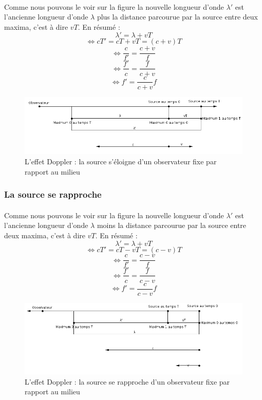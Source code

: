 \documentclass[a4paper]{article}
\begin{document}
\paragraph{}Comme nous pouvons le voir sur la figure la nouvelle longueur d'onde $\lambda'$ est l'ancienne longueur d'onde $\lambda$ plus la distance parcourue par la source entre deux maxima, c'est à dire $vT$. En résumé :
\[\lambda'=\lambda+vT\]
\[\Leftrightarrow cT'=cT+vT=(c+v)T\]
\[\Leftrightarrow \frac{c}{f'}=\frac{c+v}{f}\]
\[\Leftrightarrow \frac{f'}{c}=\frac{f}{c+v}\]
\[\Leftrightarrow f'=\frac{c}{c+v}f\]
\begin{figure}
\begin{center}
\includegraphics[width=15cm]{imgs/OfSe.png}
\end{center}
\caption{L'effet Doppler : la source s'éloigne d'un observateur fixe par rapport au milieu}
\label{L'effet Doppler : la source s'éloigne d'un observateur fixe par rapport au milieu}
\end{figure}
\subsubsection{La source se rapproche}
\paragraph{}Comme nous pouvons le voir sur la figure la nouvelle longueur d'onde $\lambda'$ est l'ancienne longueur d'onde $\lambda$ moins la distance parcourue par la source entre deux maxima, c'est à dire $vT$. En résumé :
\[\lambda'=\lambda+vT\]
\[\Leftrightarrow cT'=cT-vT=(c-v)T\]
\[\Leftrightarrow \frac{c}{f'}=\frac{c-v}{f}\]
\[\Leftrightarrow \frac{f'}{c}=\frac{f}{c-v}\]
\[\Leftrightarrow f'=\frac{c}{c-v}f\]
\begin{figure}
\begin{center}
\includegraphics[width=15cm]{imgs/OfSa.png}
\end{center}
\caption{L'effet Doppler : la source se rapproche d'un observateur fixe par rapport au milieu}
\label{L'effet Doppler : la source se rapproche d'un observateur fixe par rapport au milieu}
\end{figure}
\end{document}
